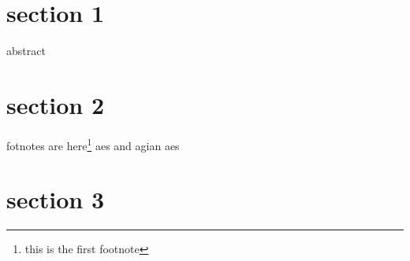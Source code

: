 
\section{section 1}
abstract

\section{section 2}

fotnotes are here\footnote{this is the first footnote}
aes and agian aes

\section{section 3}